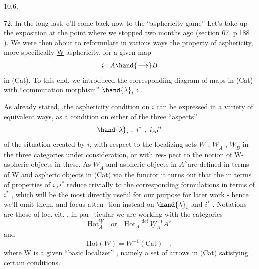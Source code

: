 
10.6.

72. In the long last, e'll come back now to the ``asphericity game''\hand{!}
 Let's take up the exposition at the point where we stopped
two months ago (section 67, p.188 ). We were then about to reformulate
in various ways the property of asphericity, more specifically
\underline{W}-asphericity, for a given map
\[ i : A \hand{\longrightarrow} B \]
in (Cat). To this end, we introduced the corresponding diagram of maps
in (Cat) with ``commutation morphism'' $\hand{\lambda}_i$ :
\hfill .

As already stated, ,the asphericity condition on $i$ can be expressed 
in a variety of equivalent ways, as a condition on either of the three
``aspects''
\[ \hand{\lambda}_i \ , \ i^{*} \ , \ i_A i^{*} \]
of the situation created by $i$, with respect to the localizing sets
$\underline{W}$ , $\underline{W}_A$ , $\underline{W}_B$ in the three categories under consideration, or with res-%
pect to the notion of \underline{W}-aspheric objects in these. As $\underline{W}_A$\hand{,} and aspheric
objects in $A^{\wedge}$\hand{,}are defined  in terms of \underline{W} and aspheric objects in (Cat)
via the functor \hand{\uline{\textcolor{black}{$i_A$ ,}}} it turns out that the  in terms of
properties of $i_A i^{*}$ reduce trivially to the corresponding formulations
in terms of $i^{*}$ , which will be the most directly useful for our 
 purpose for later work - hence we'll omit them, and focus atten-%
tion instead on $\hand{\lambda}_i$ and $i^{*}$ . Notations are those of loc. cit. , in par-%
ticular we are working with the categories
\[ \mathrm{Hot}^{\underline{W}}_{A} \quad \text{or} \quad \mathrm{Hot}_A \overset{\mathrm{def}}{=} \underline{W}_A^{-1} A^{\wedge} \]
and
\[ \mathrm{Hot}(\underline{W}) = \underline{W}^{-1} (\mathrm{Cat}) \quad , \]
where \underline{W} is a given ``basic localizer'' , namely a set of arrows in (Cat)
satisfying certain conditions.

